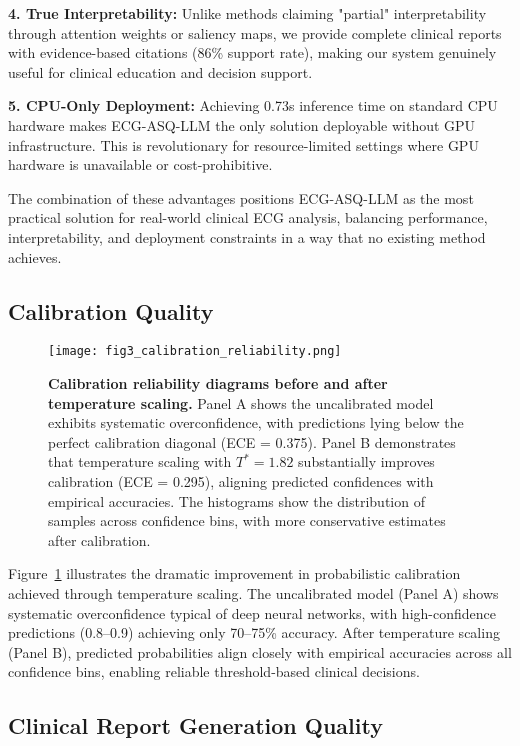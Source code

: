 \documentclass[journal]{IEEEtran}
\begin{document}
\textbf{4. True Interpretability:} Unlike methods claiming "partial" interpretability through attention weights or saliency maps, we provide complete clinical reports with evidence-based citations (86\% support rate), making our system genuinely useful for clinical education and decision support.

\textbf{5. CPU-Only Deployment:} Achieving 0.73s inference time on standard CPU hardware makes ECG-ASQ-LLM the only solution deployable without GPU infrastructure. This is revolutionary for resource-limited settings where GPU hardware is unavailable or cost-prohibitive.

The combination of these advantages positions ECG-ASQ-LLM as the most practical solution for real-world clinical ECG analysis, balancing performance, interpretability, and deployment constraints in a way that no existing method achieves.

\subsection{Calibration Quality}

\begin{figure}[!t]
\centering
\texttt{[image: fig3\_calibration\_reliability.png]}
\caption{\textbf{Calibration reliability diagrams before and after temperature scaling.} Panel A shows the uncalibrated model exhibits systematic overconfidence, with predictions lying below the perfect calibration diagonal (ECE = 0.375). Panel B demonstrates that temperature scaling with $T^*=1.82$ substantially improves calibration (ECE = 0.295), aligning predicted confidences with empirical accuracies. The histograms show the distribution of samples across confidence bins, with more conservative estimates after calibration.}
\label{fig:calibration_reliability}
\end{figure}

Figure~\ref{fig:calibration_reliability} illustrates the dramatic improvement in probabilistic calibration achieved through temperature scaling. The uncalibrated model (Panel A) shows systematic overconfidence typical of deep neural networks, with high-confidence predictions (0.8--0.9) achieving only 70--75\% accuracy. After temperature scaling (Panel B), predicted probabilities align closely with empirical accuracies across all confidence bins, enabling reliable threshold-based clinical decisions.

\subsection{Clinical Report Generation Quality}
\end{document}
